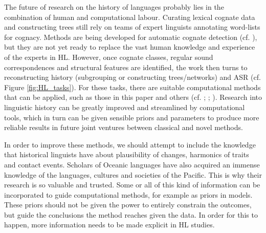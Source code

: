 \documentclass[12pt,letterpaper]{article}
\begin{document}




The future of research on the history of languages probably lies in the combination of human and computational labour. Curating lexical cognate data \citep{list2022lexibank} and constructing trees \citep{grayetal_2009} still rely on teams of expert linguists annotating word-lists for cognacy. Methods are being developed for automatic cognate detection (cf. \citealt{list2017potential}), but they are not yet ready to replace the vast human knowledge and experience of the experts in HL. However, once cognate classes, regular sound correspondences and structural features are identified, the work then turns to reconstructing history (subgrouping or constructing trees/networks) and ASR (cf. Figure \ref{fig:HL_tasks}). For these tasks, there are suitable computational methods that can be applied, such as those in this paper and others (cf. \citealt{greenhill2015evolution}; \citealt{gray_greenhill_defend_bayes}; \citealt{joy2016ancestral}). Research into linguistic history can be greatly improved and streamlined by computational tools, which in turn can be given sensible priors and parameters to produce more reliable results in future joint ventures between classical and novel methods.

In order to improve these methods, we should attempt to include the knowledge that historical linguists have about plausibility of changes, harmonics of traits and contact events. Scholars of Oceanic languages have also acquired an immense knowledge of the languages, cultures and societies of the Pacific. This is why their research is so valuable and trusted. Some or all of this kind of information can be incorporated to guide computational methods, for example as priors in models. These priors should not be given the power to entirely constrain the outcomes, but guide the conclusions the method reaches given the data. In order for this to happen, more information needs to be made explicit in HL studies.
\end{document}
